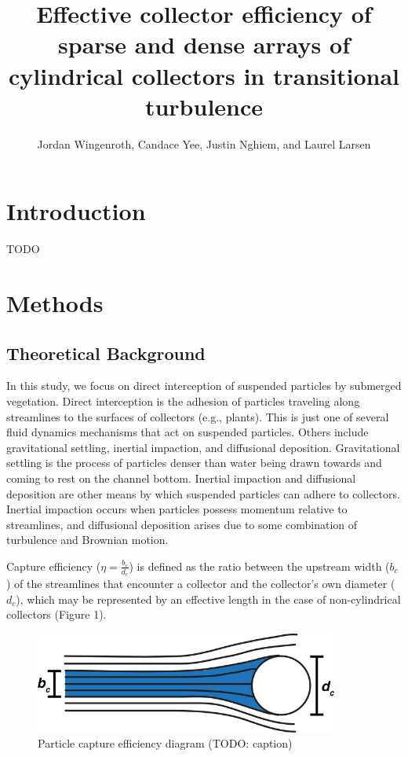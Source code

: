 \documentclass[10pt,a4paper]{article}
\author{Jordan Wingenroth, Candace Yee, Justin Nghiem, and Laurel Larsen}
\title{Effective collector efficiency of sparse and dense arrays of cylindrical collectors in transitional turbulence}
\begin{document}
\maketitle

\section{Introduction}

TODO

\section{Methods}

\subsection{Theoretical Background}

In this study, we focus on direct interception of suspended particles by submerged vegetation. Direct interception is the adhesion of particles traveling along streamlines to the surfaces of collectors (e.g., plants). This is just one of several fluid dynamics mechanisms that act on suspended particles. Others include gravitational settling, inertial impaction, and diffusional deposition. Gravitational settling is the process of particles denser than water being drawn towards and coming to rest on the channel bottom. Inertial impaction and diffusional deposition are other means by which suspended particles can adhere to collectors. Inertial impaction occurs when particles possess momentum relative to streamlines, and diffusional deposition arises due to some combination of turbulence and Brownian motion.

Capture efficiency ($\eta=\frac{b_c}{d_c}$) is defined as the ratio between the upstream width ($b_c$) of the streamlines that encounter a collector and the collector's own diameter (\(d_c\)), which may be represented by an effective length in the case of non-cylindrical collectors (Figure 1). 


\begin{figure}[h]
\includegraphics[width=10cm]{fauria particle capture efficiency diagram.jpg}
\centering
\caption{Particle capture efficiency diagram (TODO: caption)}
\end{figure}
\end{document}
